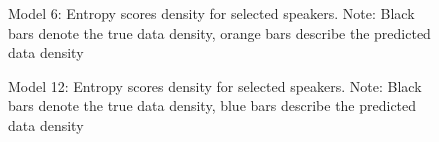 \documentclass[
]{agujournal2019}
\begin{document}
\label{cell-fig-rq3-pred-speaker_model06}
\begin{figure}[H]


\caption{\label{fig-rq3-pred-speaker_model06}Model 6: Entropy scores
density for selected speakers. Note: Black bars denote the true data
density, orange bars describe the predicted data density}

\end{figure}%

\label{cell-fig-rq3-pred-speaker_model12}
\begin{figure}[H]


\caption{\label{fig-rq3-pred-speaker_model12}Model 12: Entropy scores
density for selected speakers. Note: Black bars denote the true data
density, blue bars describe the predicted data density}

\end{figure}%
\end{document}
